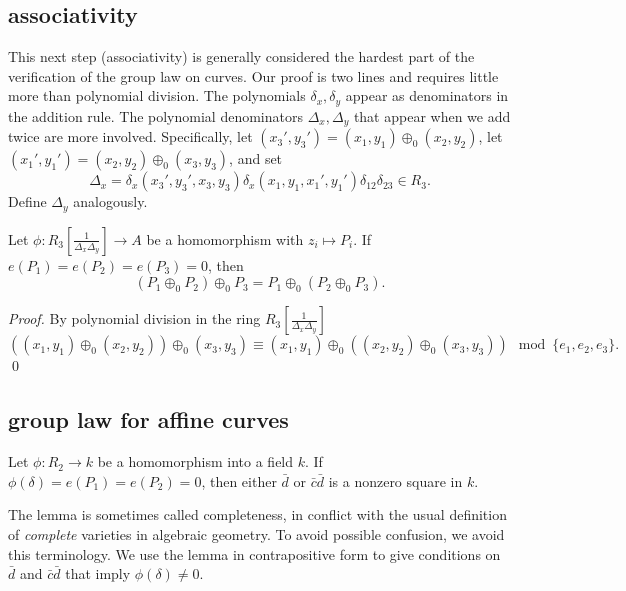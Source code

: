 \documentclass{llncs}
\newcommand{\f}[1]{\frac{1}{#1}}
\begin{document}
\subsection{associativity}\label{sec:assoc}

This next step (associativity) is generally considered the hardest
part of the verification of the group law on curves.  Our proof is two
lines and requires little more than polynomial division.  The
polynomials $\delta_x,\delta_y$ appear as denominators in the addition
rule.  The polynomial denominators $\Delta_x,\Delta_y$ that appear
when we add twice are more involved.  Specifically, let $
(x_3',y_3')=(x_1,y_1) \oplus_0 (x_2,y_2)$, let $(x_1',y_1')=(x_2,y_2)
\oplus_0 (x_3,y_3) $, and set
\[
\Delta_x = \delta_x(x_3',y_3',x_3,y_3)
\delta_x(x_1,y_1,x_1',y_1')\delta_{12}\delta_{23}\in R_3.
\]
Define $\Delta_y$ analogously.

\begin{lemma} \label{lemma:assoc} Let
  $\phi:R_3[\f{\Delta_x\Delta_y}]\to A$ be a homomorphism with
  $z_i\mapsto P_i$.  If $e(P_1)=e(P_2)=e(P_3)=0$, then
\[
(P_1 \oplus_0 P_2)\oplus_0 P_3 = 
P_1 \oplus_0 (P_2\oplus_0 P_3).
\]
\end{lemma}

\begin{proof} By polynomial division in the
  ring $R_3[\f{\Delta_x\Delta_y}]$
\[
((x_1,y_1)\oplus_0 (x_2,y_2)) \oplus_0 (x_3,y_3)\equiv
(x_1,y_1)\oplus_0 ((x_2,y_2) \oplus_0 (x_3,y_3)) \mod \{e_1,e_2,e_3\}.
\]
\qed\end{proof}

\subsection{group law for affine curves}

\begin{lemma} \label{lemma:affine} Let $\phi:R_2\to k$
  be a homomorphism into a field $k$.  If
  $\phi(\delta)=e(P_1)=e(P_2)=0$, then either $\bar d$ or $\bar c \bar
  d$ is a nonzero square in $k$.
\end{lemma}

The lemma is sometimes called completeness, in conflict with the
usual definition of \emph{complete} varieties in algebraic geometry.  To avoid
possible confusion, we avoid this terminology.  We use the lemma in
contrapositive form to give conditions on $\bar d$ and $\bar c\bar d$
that imply $\phi(\delta)\ne0$.
\end{document}
